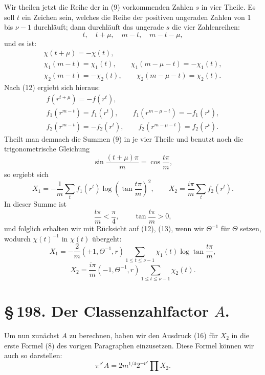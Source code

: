 \documentclass[11pt]{article}
\begin{document}
Wir theilen jetzt die Reihe der in (9) vorkommenden Zahlen $s$ in vier Theile. Es soll $t$ ein Zeichen sein, welches die
Reihe der positiven ungeraden Zahlen von 1 bis $\nu-1$ durchläuft; dann durchläuft das ungerade $s$ die vier Zahlenreihen:
\[
t,
\quad t+\mu,
\quad m-t,
\quad m-t-\mu,
\]
und es ist:
\[
\begin{gathered}
\chi(t+\mu)=-\chi(t),\\
\chi_1(m-t)=\chi_1(t),\qquad \chi_1(m-\mu-t)=-\chi_1(t),\\
\chi_2(m-t)=-\chi_2(t),\qquad \chi_2(m-\mu-t)=\chi_2(t).
\end{gathered}
\]
Nach (12) ergiebt sich hieraus:
\[
\begin{gathered}
f(r^{t+\mu})=-f(r^t),\\
f_1(r^{m-t})=f_1(r^t),\qquad f_1(r^{m-\mu-t})=-f_1(r^t),\\
f_2(r^{m-t})=-f_2(r^t),\qquad f_2(r^{m-\mu-t})=f_2(r^t).
\end{gathered}
\]
Theilt man demnach die Summen (9) in je vier Theile und benutzt noch die trigonometrische Gleichung
\[
\sin\frac{(t+\mu)\pi}{m}=\cos\frac{t\pi}{m},
\]
so ergiebt sich
\[
X_1=-\frac1m\sum_t f_1(r^t)\log\left(\tan\frac{t\pi}{m}\right)^2,
\qquad
X_2=\frac{i\pi}{m}\sum_t f_2(r^t).
\]
In dieser Summe ist
\[
\frac{t\pi}{m}<\frac\pi4,
\qquad
\tan\frac{t\pi}{m}>0,
\]
und folglich erhalten wir mit Rücksicht auf (12), (13), wenn wir $\Theta^{-1}$ für $\Theta$ setzen, wodurch $\chi(t)^{-1}$ in $\chi(t)$ übergeht:
\begin{equation}
X_1=-\frac2m(+1,\Theta^{-1},r)
\sum_{1\le t\le\nu-1}\chi_1(t)\log\tan\frac{t\pi}{m},
\tag{15}
\end{equation}
\begin{equation}
X_2=\frac{i\pi}{m}(-1,\Theta^{-1},r)
\sum_{1\le t\le\nu-1}\chi_2(t).
\tag{16}
\end{equation}

\section*{\S\,198. Der Classenzahlfactor $A$.}

Um nun zunächst $A$ zu berechnen, haben wir den Ausdruck (16) für $X_2$ in die erste Formel (8) des vorigen Paragraphen einzusetzen. Diese Formel können wir auch so darstellen:
\begin{equation}
\pi^{\nu'}A=2m^{1/4}2^{-\nu'}\prod X_2.
\tag{1}
\end{equation}
\end{document}
